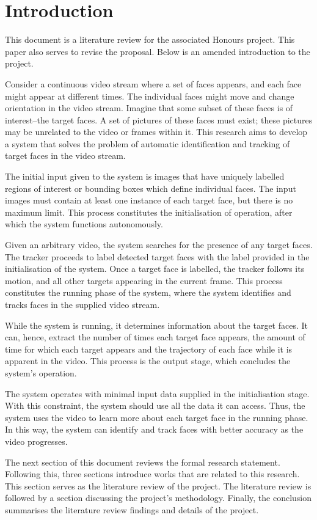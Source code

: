 \section{Introduction}
  This document is a literature review for the associated Honours project.
  This paper also serves to revise the proposal.
  Below is an amended introduction to the project.

  Consider a continuous video stream where a set of faces appears, and each face might appear at different times.
  The individual faces might move and change orientation in the video stream.
  Imagine that some subset of these faces is of interest--the target faces.
  A set of pictures of these faces must exist; these pictures may be unrelated to the video or frames within it.
  This research aims to develop a system that solves the problem of automatic identification and tracking of target faces in the video stream.

  The initial input given to the system is images that have uniquely labelled regions of interest or bounding boxes which define individual faces.
  The input images must contain at least one instance of each target face, but there is no maximum limit.
  This process constitutes the initialisation of operation, after which the system functions autonomously.

  Given an arbitrary video, the system searches for the presence of any target faces.
  The tracker proceeds to label detected target faces with the label provided in the initialisation of the system.
  Once a target face is labelled, the tracker follows its motion, and all other targets appearing in the current frame.
  This process constitutes the running phase of the system, where the system identifies and tracks faces in the supplied video stream.

  While the system is running, it determines information about the target faces.
  It can, hence, extract the number of times each target face appears, the amount of time for which each target appears and the trajectory of each face while it is apparent in the video.
  This process is the output stage, which concludes the system's operation.

  The system operates with minimal input data supplied in the initialisation stage.
  With this constraint, the system should use all the data it can access. 
  Thus, the system uses the video to learn more about each target face in the running phase.
  In this way, the system can identify and track faces with better accuracy as the video progresses.

  The next section of this document reviews the formal research statement.
  Following this, three sections introduce works that are related to this research.
  This section serves as the literature review of the project. 
  The literature review is followed by a section discussing the project's methodology.
  Finally, the conclusion summarises the literature review findings and details of the project.
